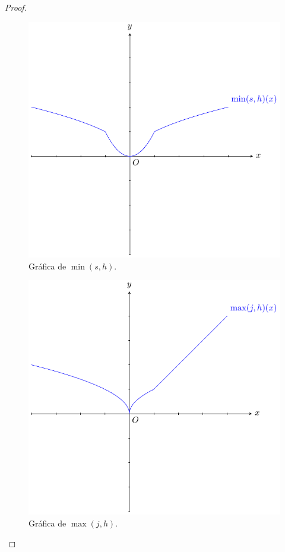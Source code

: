 \documentclass[12pt]{article}
\begin{document}
\begin{enumerate}
\begin{proof}
        \begin{figure}
            \begin{center}
                \includegraphics[scale=1]{images/3_12_4.pdf}
            \end{center}
            \caption{Gráfica de $\min(s,h)$.}
        \end{figure}

        \begin{figure}
            \begin{center}
                \includegraphics[scale=1]{images/3_12_5.pdf}
            \end{center}
            \caption{Gráfica de $\max(j,h)$.}
        \end{figure}


\end{proof}
\end{enumerate}
\end{document}
